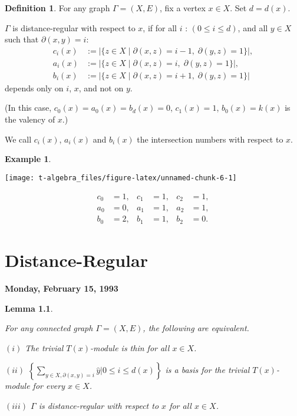 \documentclass[
]{book}
\newtheorem{lemma}{Lemma}[chapter]
\theoremstyle{definition}
\newtheorem{definition}{Definition}[chapter]
\theoremstyle{definition}
\newtheorem{example}{Example}[chapter]
\theoremstyle{definition}
\theoremstyle{definition}
\theoremstyle{remark}
\begin{document}
\begin{definition}
\protect\hypertarget{def:distance-regular}{}\label{def:distance-regular}For any graph \(\Gamma = (X, E)\), fix a vertex \(x\in X\). Set \(d = d(x)\).

\(\Gamma\) is distance-regular  with respect to \(x\), if for all \(i\) : \((0\leq i\leq d)\), and all \(y\in X\) such that \(\partial(x,y) = i\):
\begin{align}
c_i(x) & := |\{z\in X \mid \partial(x,z) = i-1, \; \partial(y,z) = 1\}|,\\
a_i(x) & := |\{z\in X \mid \partial(x,z) = i, \; \partial(y,z) = 1\}|,\\
b_i(x) & := |\{z\in X \mid \partial(x,z) = i+1, \; \partial(y,z) = 1\}|
\end{align}
depends only on \(i\), \(x\), and not on \(y\).

(In this case, \(c_0(x) = a_0(x) = b_d(x) = 0\), \(c_1(x) = 1\), \(b_0(x) = k(x)\) is the valency of \(x\).)

We call \(c_i(x)\), \(a_i(x)\) and \(b_i(x)\) the intersection numbers with respect to \(x\).
\end{definition}

\begin{example}
\leavevmode

\begin{center}\texttt{[image: t-algebra\_files/figure-latex/unnamed-chunk-6-1]} \end{center}

\begin{align}
c_0 &= 1, & c_1 &= 1, & c_2 &= 1,\\
a_0 &= 0, & a_1 &= 1, & a_2 &= 1,\\
b_0 &= 2, & b_1 &= 1, & b_2 &= 0.
\end{align}

\end{example}

\hypertarget{lec12}{%
\chapter{Distance-Regular}\label{lec12}}

\textbf{Monday, February 15, 1993}

\begin{lemma}
\protect\hypertarget{lem:distance-reguarity}{}\label{lem:distance-reguarity}

For any connected graph \(\Gamma = (X, E)\), the following are equivalent.

\((i)\) The trivial \(T(x)\)-module is thin for all \(x\in X\).

\((ii)\) \(\displaystyle{\left\{\sum_{y\in X, \partial(x,y) = i}\hat{y} \left| 0\leq i\leq d(x)\right.\right\}}\) is a basis for the trivial \(T(x)\)-module for every \(x\in X\).

\((iii)\) \(\Gamma\) is distance-regular with respect to \(x\) for all \(x\in X\).

\end{lemma}
\end{document}
